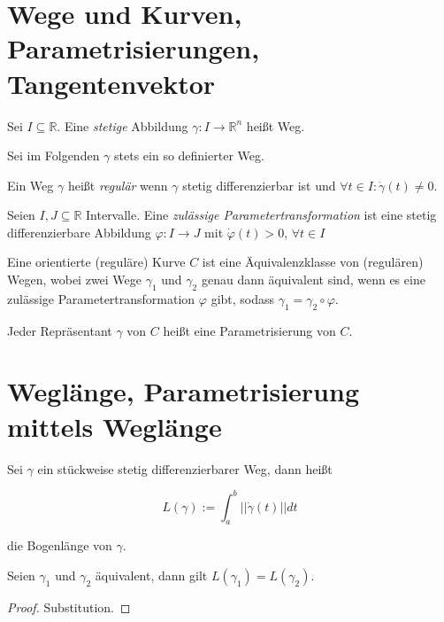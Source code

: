 \section{Wege und Kurven, Parametrisierungen, Tangentenvektor}
\begin{definition}[Weg]
	Sei $I \subseteq \mathbb{R}$. Eine \textit{stetige} Abbildung $\gamma: I \rightarrow \mathbb{R}^n$ hei\ss t Weg.
\end{definition}

Sei im Folgenden $\gamma$ stets ein so definierter Weg.

\begin{definition}
	Ein Weg $\gamma$ hei\ss t \textit{regul\"ar} wenn $\gamma$ stetig differenzierbar ist und $\forall t \in I: \dot{\gamma}(t) \neq 0$.
\end{definition}

\begin{definition}[Parametertransformation]
	Seien $I,J \subseteq \mathbb{R}$ Intervalle.
	Eine \textit{zul\"assige Parametertransformation} ist eine stetig differenzierbare Abbildung $\varphi: I \rightarrow J$ mit $\dot{\varphi}(t) > 0$, $\forall t \in I$
\end{definition}

\begin{definition}[Kurve]
	Eine orientierte (regul\"are) Kurve $C$ ist eine \"Aquivalenzklasse von (regul\"aren) Wegen, wobei zwei Wege $\gamma_1$ und $\gamma_2$ genau dann \"aquivalent sind, wenn es eine zul\"assige Parametertransformation $\varphi$ gibt, sodass $\gamma_1 = \gamma_2 \circ \varphi$.
	
	Jeder Repr\"asentant $\gamma$ von $C$ hei\ss t eine Parametrisierung von $C$.
\end{definition}




\section{Wegl\"ange, Parametrisierung mittels Wegl\"ange}
\begin{definition}
	Sei $\gamma$ ein st\"uckweise stetig differenzierbarer Weg, dann hei\ss t 
	
	$$L(\gamma) := \int_a^b ||\dot{\gamma}(t)||dt$$
	
	die Bogenl\"ange von $\gamma$.
\end{definition}

\begin{lemma}
	Seien $\gamma_1$ und $\gamma_2$ \"aquivalent, dann gilt $L(\gamma_1) = L(\gamma_2)$.
\end{lemma}
\begin{proof}
	Substitution.
\end{proof}

